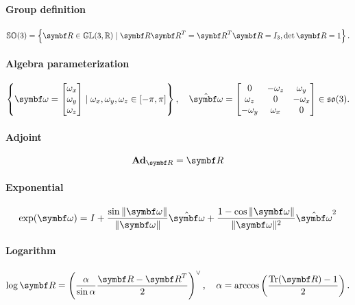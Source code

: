 \begin{properties}[breakable, title={$\SOthree$}]
  \paragraph{Group definition}
  \begin{equation}
    \SOthree = \left\{ \bR \in \GL(3, \mathbb{R}) \mid \bR \bR^{T} = \bR^{T} \bR = I_{3}, \det \bR = 1 \right\}.
  \end{equation}

  \paragraph{Algebra parameterization}
  \begin{equation}
    \left\{ \bomega = \begin{bmatrix} \omega_{x} \\ \omega_{y} \\ \omega_{z} \end{bmatrix}
    \mid \omega_{x}, \omega_{y}, \omega_{z} \in [-\pi, \pi] \right\}, \quad \hat \bomega = \begin{bmatrix} 0 & -\omega_{z} & \omega_{y} \\ \omega_{z} & 0 & -\omega_{x} \\ -\omega_{y} & \omega_{x} & 0 \end{bmatrix} \in \sothree.
  \end{equation}

  \paragraph{Adjoint}
  \begin{equation}
    \bAd_{\bR} = \bR
  \end{equation}

  \paragraph{Exponential}
  \begin{equation}
    \label{eq:so3_exp}
    \exp (\bomega) = I + \frac{\sin \| \bomega \|}{\|\bomega \|} \hat {\bomega} + \frac{1 - \cos \| \bomega \|}{\| \bomega \|^2} \hat {\bomega}^2
  \end{equation}

  \paragraph{Logarithm}
  \begin{equation}
    \label{eq:so3_log}
    \log \bR = \left(\frac{\alpha}{\sin \alpha} \frac{\bR - \bR^T}{2} \right)^{\vee}, \quad \alpha = \arccos \left( \frac{\tr(\bR) - 1}{2} \right).
  \end{equation}


\end{properties}
